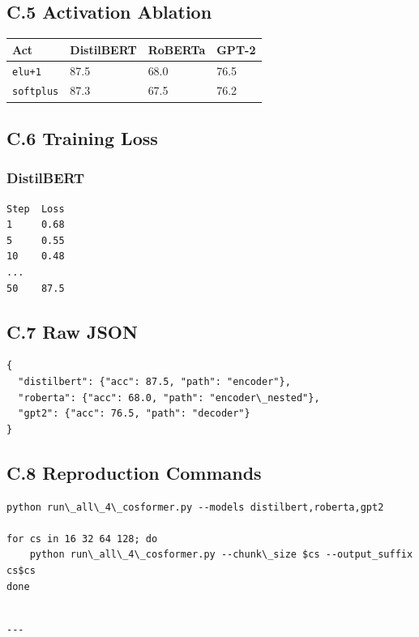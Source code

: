 \subsection{C.5 Activation Ablation}

\begin{table}[H]
\centering
\small
\begin{tabular}{llll}
\toprule
\textbf{Act} & \textbf{DistilBERT} & \textbf{RoBERTa} & \textbf{GPT-2} \\
\midrule
\texttt{elu+1} & 87.5 & 68.0 & 76.5 \\
\texttt{softplus} & 87.3 & 67.5 & 76.2 \\
\bottomrule
\end{tabular}
\end{table}

\subsection{C.6 Training Loss}

\subsubsection{DistilBERT}

\begin{lstlisting}
Step  Loss
1     0.68
5     0.55
10    0.48
...
50    87.5
\end{lstlisting}

\subsection{C.7 Raw JSON}

\begin{lstlisting}
{
  "distilbert": {"acc": 87.5, "path": "encoder"},
  "roberta": {"acc": 68.0, "path": "encoder\_nested"},
  "gpt2": {"acc": 76.5, "path": "decoder"}
}
\end{lstlisting}

\subsection{C.8 Reproduction Commands}

\begin{lstlisting}
python run\_all\_4\_cosformer.py --models distilbert,roberta,gpt2

for cs in 16 32 64 128; do
    python run\_all\_4\_cosformer.py --chunk\_size $cs --output_suffix cs$cs
done
\end{lstlisting}
\begin{lstlisting}

---
\end{lstlisting}

